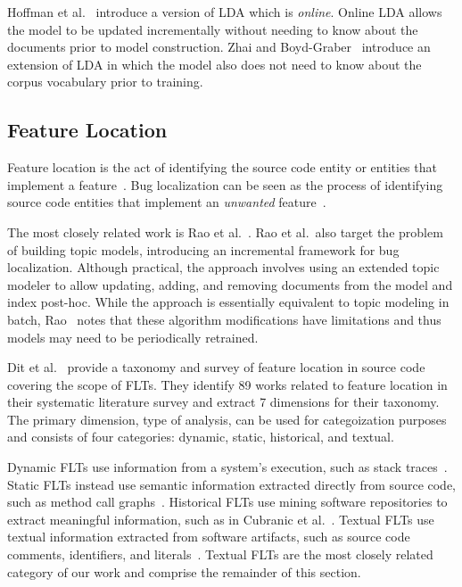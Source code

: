 Hoffman et al.~\cite{Hoffman-etal:2010} introduce a version of LDA which is
\emph{online}.  Online LDA allows the model to be updated incrementally without
needing to know about the documents prior to model construction.  Zhai and
Boyd-Graber~\cite{Zhai-Boyd-Graber:2013} introduce an extension of LDA in which
the model also does not need to know about the corpus vocabulary prior to
training.


\subsection{Feature Location}

Feature location is the act of identifying the source code entity or entities
that implement a feature~\cite{Rajlich-Wilde:2002}.  Bug localization can be
seen as the process of identifying source code entities that implement an
\emph{unwanted} feature~\cite{Lukins-etal:2010}.

The most closely related work is Rao et al.~\cite{Rao-etal:2013}. Rao et al.\
also target the problem of building topic models, introducing an incremental
framework for bug localization.  Although practical, the approach involves using
an extended topic modeler to allow updating, adding, and removing documents from
the model and index post-hoc.  While the approach is essentially equivalent to
topic modeling in batch, Rao~\cite{Rao:2013} notes that these algorithm
modifications have limitations and thus models may need to be periodically
retrained.

Dit et al.~\cite{Dit-etal:2011} provide a taxonomy and survey of feature
location in source code covering the scope of FLTs.  They identify 89 works
related to feature location in their systematic literature survey and extract
7 dimensions for their taxonomy.  The primary dimension, type of analysis, can
be used for categoization purposes and consists of four categories: dynamic,
static, historical, and textual.

Dynamic FLTs use information from a system's execution, such as stack
traces~\cite{Moreno-etal:2014}.  Static FLTs instead use semantic information
extracted directly from source code, such as method call
graphs~\cite{Saul-etal:2007}.  Historical FLTs use mining software repositories
to extract meaningful information, such as in Cubranic et
al.~\cite{Cubranic-etal:2005}.  Textual FLTs use textual information extracted
from software artifacts, such as source code comments, identifiers, and
literals~\cite{Biggers-etal:2014}. Textual FLTs are the most closely related
category of our work and comprise the remainder of this section.

